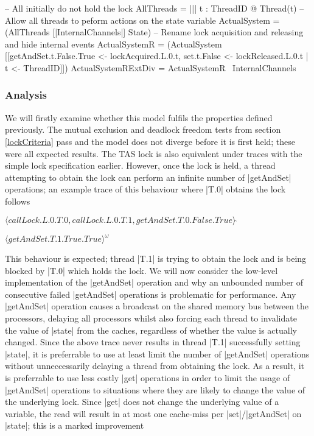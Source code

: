 \begin{cspm}
  -- All initially do not hold the lock
  AllThreads = ||| t : ThreadID @ Thread(t)
  -- Allow all threads to peform actions on the state variable
  ActualSystem = (AllThreads [|InternalChannels|] State)
  -- Rename lock acquisition and releasing and hide internal events
  ActualSystemR = (ActualSystem 
                    [[getAndSet.t.False.True <- lockAcquired.L.0.t, 
                    set.t.False <- lockReleased.L.0.t | t <- ThreadID]])
  ActualSystemRExtDiv = ActualSystemR \ InternalChannels
\end{cspm}

\subsubsection{Analysis}

We will firstly examine whether this model fulfils the properties defined previously. The mutual exclusion and deadlock freedom tests from section \ref{lockCriteria} pass and the model does not diverge before it is first held; these were all expected results. The TAS lock is also equivalent under traces with the simple lock specification earlier. However, once the lock is held, a thread attempting to obtain the lock can perform an infinite number of |getAndSet| operations; an example trace of this behaviour where |T.0| obtains the lock follows

  $\langle callLock.L.0.T.0, callLock.L.0.T.1, getAndSet.T.0.False.True \rangle \,\hat{ }$ 
  
  $\langle getAndSet.T.1.True.True \rangle^\omega$

This behaviour is expected; thread |T.1| is trying to obtain the lock and is being blocked by |T.0| which holds the lock. We will now consider the low-level implementation of the |getAndSet| operation and why an unbounded number of consecutive failed |getAndSet| operations is problematic for performance. Any |getAndSet| operation causes a broadcast on the shared memory bus between the processors, delaying all processors whilst also forcing each thread to invalidate the value of |state| from the caches, regardless of whether the value is actually changed. Since the above trace never results in thread |T.1| successfully setting |state|, it is preferrable to use at least limit the number of |getAndSet| operations without unneccessarily delaying a thread from obtaining the lock. As a result, it is preferrable to use less costly |get| operations in order to limit the usage of |getAndSet| operations to situations where they are likely to change the value of the underlying lock. Since |get| does not change the underlying value of a variable, the read will result in at most one cache-miss per |set|/|getAndSet| on |state|; this is a marked improvement 


